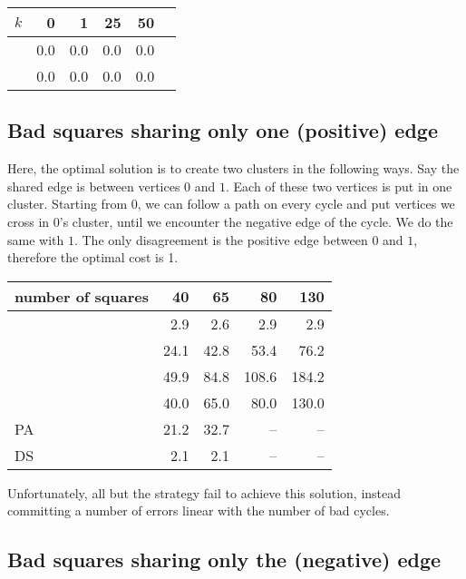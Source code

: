 \begin{center}
\begin{tabular}{lrrrrr}
\toprule
$k$ &   0  &   1  &   25 &   50  \\
\midrule
\pot{} & 0.0 & 0.0 & 0.0 & 0.0  \\
\pat{} &  0.0 &  0.0 & 0.0 & 0.0  \\
\bottomrule
\end{tabular}
\end{center}

\subsection{Bad squares sharing only one (positive) edge}
\label{sub:squares}
Here, the optimal solution is to create two clusters in the following ways.
Say the shared edge is between vertices $0$ and $1$. Each of these two
vertices is put in one cluster. Starting from $0$, we can follow a path on
every cycle and put vertices we cross in $0$'s cluster, until we encounter the
negative edge of the cycle. We do the same with $1$. The only disagreement is
the positive edge between $0$ and $1$, therefore the optimal cost is 1.

\begin{center}
\begin{tabular}{lrrrr}
\toprule
number of squares & 40   & 65   & 80    & 130 \\
\midrule
\pot{}            & 2.9  & 2.6  & 2.9   & 2.9 \\
\pat{}            & 24.1 & 42.8 & 53.4  & 76.2 \\
\nnot{}           & 49.9 & 84.8 & 108.6 & 184.2 \\
\nat{}            & 40.0 & 65.0 & 80.0  & 130.0\\
PA                & 21.2 & 32.7 & --    & --\\
DS                & 2.1  & 2.1  & --    & --\\
\bottomrule
\end{tabular}
\end{center}

Unfortunately, all but the \pot{} strategy fail to achieve this solution,
instead committing a number of errors linear with the number of bad cycles.


\subsection{Bad squares sharing only the (negative) edge}

